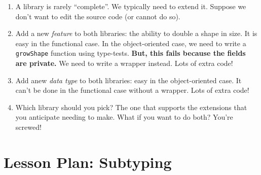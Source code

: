 \documentclass[9pt]{extbook}
\begin{document}
\begin{enumerate}
  \item A library is rarely ``complete''. We typically need to extend it. Suppose we
    don't want to edit the source code (or cannot do so).

  \item Add a new \emph{feature} to both libraries: the ability to
    double a shape in size. It is easy in the functional case. In the
    object-oriented case, we need to write a \lstinline|growShape|
    function using type-tests. \textbf{But, this fails because the
      fields are private.} We need to write a wrapper instead. Lots of extra code!

  \item Add anew \emph{data type} to both libraries: easy in the object-oriented
    case. It can't be done in the functional case without a wrapper. Lots of extra code!

  \item Which library should you pick? The one that supports the extensions that you
    anticipate needing to make. What if you want to do both? You're screwed!

\end{enumerate}

\chapter{Lesson Plan: Subtyping}
\end{document}
